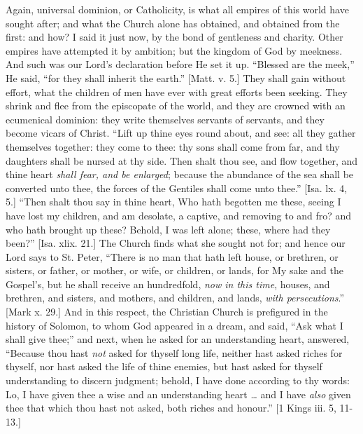 Again, universal dominion, or Catholicity, is what all empires of
this world have sought after; and what the Church alone has obtained,
and obtained from the first: and how? I said it just now, by the bond
of gentleness and charity. Other empires have attempted it by
ambition; but the kingdom of God by meekness. And such was our Lord's
declaration before He set it up. ``Blessed are the meek,'' He
said, ``for they shall inherit the earth.'' [Matt. v. 5.] They
shall gain without effort, what the children of men have ever with
great efforts been seeking. They shrink and flee from the episcopate
of the world, and they are crowned with an ecumenical dominion: they
write themselves servants of servants, and they become vicars of
Christ. ``Lift up thine eyes round about, and see: all they gather
themselves together: they come to thee: thy sons shall come from far,
and thy daughters shall be nursed at thy side. Then shalt thou see,
and flow together, and thine heart \emph{shall fear, and be enlarged};
because the abundance of the sea shall be converted unto thee, the
forces of the Gentiles shall come unto thee.'' [Isa. lx. 4, 5.]
``Then shalt thou say in thine heart, Who hath begotten me these,
seeing I have lost my children, and am desolate, a captive, and removing to and fro? and who hath brought up these? Behold, I was left
alone; these, where had they been?'' [Isa. xlix. 21.] The Church
finds what she sought not for; and hence our Lord says to St. Peter,
``There is no man that hath left house, or brethren, or sisters,
or father, or mother, or wife, or children, or lands, for My sake and
the Gospel's, but he shall receive an hundredfold, \emph{now in this time},
houses, and brethren, and sisters, and mothers, and children, and
lands, \emph{with persecutions}.'' [Mark x. 29.] And in this
respect, the Christian Church is prefigured in the history of Solomon,
to whom God appeared in a dream, and said, ``Ask what I shall give
thee;'' and next, when he asked for an understanding heart,
answered, ``Because thou hast \emph{not} asked for thyself long
life, neither hast asked riches for thyself, nor hast asked the life
of thine enemies, but hast asked for thyself understanding to discern
judgment; behold, I have done according to thy words: Lo, I have given
thee a wise and an understanding heart … and I have \emph{also}
given thee that which thou hast not asked, both riches and
honour.'' [1 Kings iii. 5, 11-13.]

